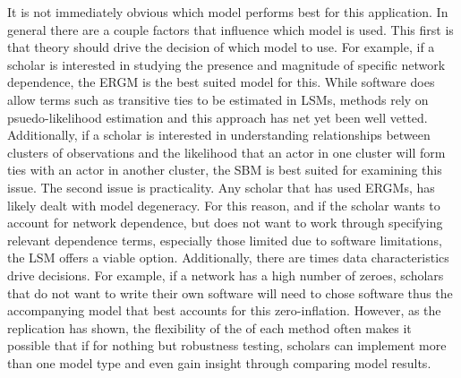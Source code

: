 \documentclass[fleqn,12pt]{wlscirep}
\begin{document}
It is not immediately obvious which model performs best for this application. In general there are a couple factors that influence which model is used. This first is that theory should drive the decision of which model to use. For example, if a scholar is interested in studying the presence and magnitude of specific network dependence, the ERGM is the best suited model for this. While software does allow terms such as transitive ties to be estimated in LSMs, methods rely on psuedo-likelihood estimation and this approach has net yet been well vetted. Additionally, if a scholar is interested in understanding relationships between clusters of observations and the likelihood that an actor in one cluster will form ties with an actor in another cluster, the SBM is best suited for examining this issue. The second issue is practicality. Any scholar that has used ERGMs, has likely dealt with model degeneracy. For this reason, and if the scholar wants to account for network dependence, but does not want to work through specifying relevant dependence terms, especially those limited due to software limitations, the LSM offers a viable option. Additionally, there are times data characteristics drive decisions. For example, if a network has a high number of zeroes, scholars that do not want to write their own software will need to chose software thus the accompanying model that best accounts for this zero-inflation. However, as the replication has shown, the flexibility of the of each method often makes it possible that if for nothing but robustness testing, scholars can implement more than one model type and even gain insight through comparing model results. 
\end{document}

